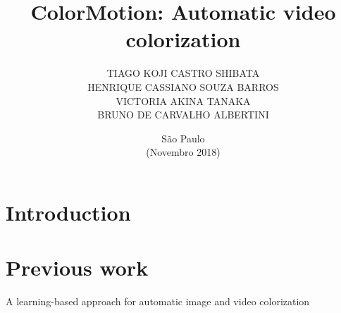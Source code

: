 \documentclass[12pt,openright,twoside,a4paper,brazil]{abntex2}
\author{TIAGO KOJI CASTRO SHIBATA\\
HENRIQUE CASSIANO SOUZA BARROS\\
VICTORIA AKINA TANAKA\\
BRUNO DE CARVALHO ALBERTINI}
\title{ColorMotion: Automatic video colorization}
\date{São Paulo\\(Novembro 2018)}
\begin{document}
\imprimircapa
\imprimirfalsafolhaderosto
\imprimirfolhaderosto

\maketitle

\section{Introduction}

\section{Previous work}
A learning-based approach for automatic image and video colorization
\end{document}
